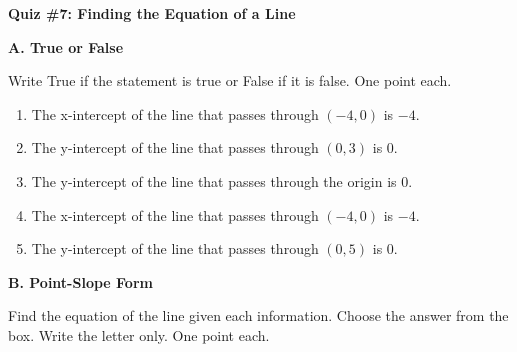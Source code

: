

\def \Lesson {Finding the Equation of a Line}
\def \QuizCode {7}


	\begin{center}
		\textbf{\large Quiz \#\QuizCode: \Lesson}
	\end{center}

    \vspace*{2em}

    \noindent \textbf{A. True or False} 
    
    Write True if the statement is true or False if it is false. One point each.
    
    \begin{enumerate}
    	\item The x-intercept of the line that passes through $ (-4, 0) $ is $ -4 $.
    	\item The y-intercept of the line that passes through $ (0, 3) $ is $ 0 $.
    	\item The y-intercept of the line that passes through the origin is $ 0 $.
    	\item The x-intercept of the line that passes through $ (-4, 0) $ is $ -4 $.
    	\item The y-intercept of the line that passes through $ (0, 5) $ is $ 0 $.
    \end{enumerate}

    \vspace*{1.3ex}
    
    \noindent \textbf{B. Point-Slope Form} 
    
    Find the equation of the line given each information. Choose the answer from the box. Write the letter only. One point each.
    
    \begin{center}  
    \end{center}
    
